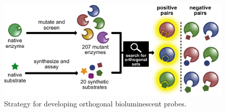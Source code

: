 \documentclass[11pt]{article}
\begin{document}
\begin{figure}
\vspace{-0.2in}
\begin{centering}
\includegraphics[width=\textwidth]{figures/Previous_research/algorithm_v4.pdf}

\end{centering}
\footnotesize
\caption{\label{figure:algorithm}
Strategy for developing orthogonal bioluminescent probes.
}
\end{figure}
\end{document}

